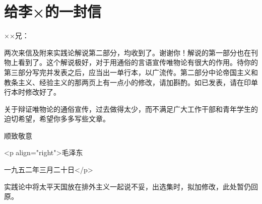 \section[给李×的一封信（一九五二年三月二十日）]{给李×的一封信}


××兄：

两次来信及附来实践论解说第二部分，均收到了。谢谢你！解说的第一部分也在刊物上看到了。这个解说极好，对于用通俗的言语宣传唯物论有很大的作用。待你的第三部分写完并发表之后，应当出一单行本，以广流传。第二部分中论帝国主义和教条主义、经验主义的那两页上有一点小的修改，请加斟酌。如已发表，请在印单行本时修改好了。

关于辩证唯物论的通俗宣传，过去做得太少，而不满足广大工作干部和青年学生的迫切希望，希望你多多写些文章。

顺致敬意

<p align="right">毛泽东

一九五二年三月二十日</p>

实践论中将太平天国放在排外主义一起说不妥，出选集时，拟加修改，此处暂仍回原。


